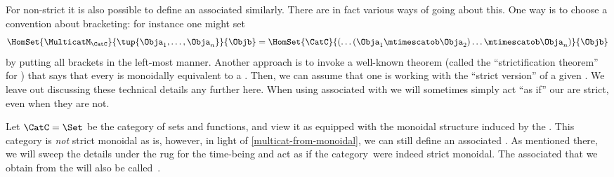 {%


\begin{remark}
    \label{multicat-from-monoidal}
    For non-strict  it is also possible to define an associated  similarly.
    There are in fact various ways of going about this.
    One way is to choose a convention about bracketing: for instance one might set
    \begin{equation}
        \HomSet{\MulticatM_\CatC}{\tup{\Obja_1,\ldots,\Obja_n}}{\Objb}=\HomSet{\CatC}{ ( \dots (\Obja_1 \mtimescatob \Obja_2) \ldots \mtimescatob \Obja_n)}{\Objb}
    \end{equation}
    by putting all brackets in the left-most manner.
    Another approach is to invoke a well-known theorem (called the ``strictification theorem'' for ) that says that every  is monoidally equivalent to a .
    Then, we can assume that one is working with the ``strict version'' of a given .
    We leave out discussing these technical details any further here.
    When using  associated with  we will sometimes simply act ``as if'' our  are strict, even when they are not.
\end{remark}

\begin{example}
    Let $\CatC = \Set$ be the category of sets and functions, and view it as equipped with the monoidal structure induced by the .
    This category is \emph{not} strict monoidal as is, however, in light of \cref{multicat-from-monoidal}, we can still define an associated .
    As mentioned there, we will sweep the details under the rug for the time-being and act as if the category~\Set were indeed strict monoidal.
    The associated  that we obtain from the  \Set will also be called~\Set.
\end{example}

}
